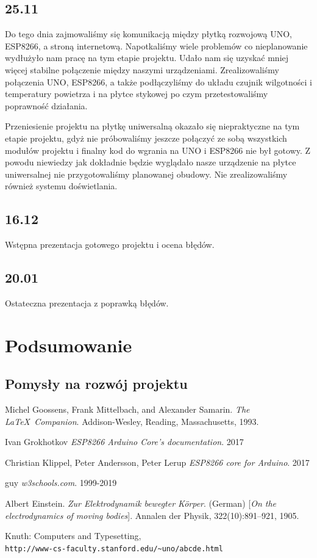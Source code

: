 \documentclass[12pt]{article}
\begin{document}
\subsection{25.11}
Do tego dnia zajmowaliśmy się komunikacją między płytką rozwojową UNO, ESP8266, a stroną internetową. Napotkaliśmy wiele problemów co nieplanowanie wydłużyło nam pracę na tym etapie projektu. Udało nam się uzyskać mniej więcej stabilne połączenie między naszymi urządzeniami. Zrealizowaliśmy połączenia UNO, ESP8266, a także podłączyliśmy do układu czujnik wilgotności i temperatury powietrza i na płytce stykowej po czym przetestowaliśmy poprawność działania. 

Przeniesienie projektu na płytkę uniwersalną okazało się niepraktyczne na tym etapie projektu, gdyż nie próbowaliśmy jeszcze połączyć ze sobą wszystkich modułów projektu i finalny kod do wgrania na UNO i ESP8266 nie był gotowy. Z powodu niewiedzy jak dokładnie będzie wyglądało nasze urządzenie na płytce uniwersalnej nie przygotowaliśmy planowanej obudowy. Nie zrealizowaliśmy również systemu doświetlania.

\subsection{16.12}
Wstępna prezentacja gotowego projektu i ocena błędów.

\subsection{20.01}
Ostateczna prezentacja z poprawką błędów.



\section{Podsumowanie }
\subsection{Pomysły na rozwój projektu }
\begin{thebibliography}{9}


Michel Goossens, Frank Mittelbach, and Alexander Samarin. 
\textit{The \LaTeX\ Companion}. 
Addison-Wesley, Reading, Massachusetts, 1993.

Ivan Grokhotkov
\textit{ESP8266 Arduino Core’s documentation}. 
2017

Christian Klippel, Peter Andersson, Peter Lerup
\textit{ESP8266 core for Arduino}. 
2017

guy
\textit{w3schools.com}. 
1999-2019
 
Albert Einstein. 
\textit{Zur Elektrodynamik bewegter K{\"o}rper}. (German) 
[\textit{On the electrodynamics of moving bodies}]. 
Annalen der Physik, 322(10):891–921, 1905.
 
Knuth: Computers and Typesetting,
\\\texttt{http://www-cs-faculty.stanford.edu/\~{}uno/abcde.html}
\end{thebibliography}
\end{document}
